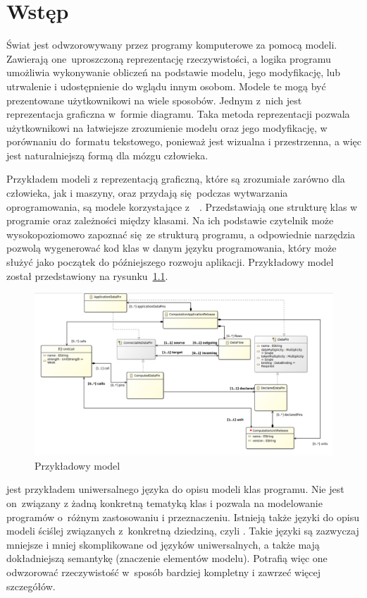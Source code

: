 \chapter{Wstęp}

Świat jest odwzorowywany przez programy komputerowe za pomocą modeli.
Zawierają one~uproszczoną reprezentację rzeczywistości, a logika programu
umożliwia wykonywanie obliczeń na podstawie modelu, jego modyfikację, lub
utrwalenie i udostępnienie do wglądu innym osobom.
Modele te mogą być prezentowane użytkownikowi na wiele sposobów. Jednym z~nich
jest reprezentacja graficzna w~formie diagramu. Taka metoda reprezentacji
pozwala użytkownikowi na łatwiejsze zrozumienie modelu
oraz jego modyfikację, w porównaniu do~formatu tekstowego, ponieważ jest
wizualna i przestrzenna, a więc jest naturalniejszą formą dla mózgu człowieka.

Przykładem modeli z reprezentacją graficzną, które są zrozumiałe zarówno dla
człowieka, jak i maszyny, oraz
przydają się podczas wytwarzania oprogramowania, są modele korzystające
z~~\cite{wikipedia-uml}. Przedstawiają
one strukturę klas w programie oraz zależności między klasami. Na ich podstawie
czytelnik może wysokopoziomowo zapoznać się~ze strukturą programu, a
odpowiednie narzędzia pozwolą wygenerować kod klas w danym języku
programowania, który może służyć jako początek do późniejszego rozwoju
aplikacji. Przykładowy model  został przedstawiony na
rysunku~\ref{rys:przykladowy-model-uml}.

\begin{figure}[!ht]
	\centering
	\includegraphics[width=0.95\linewidth]{./images/example-uml-model.png}
	\caption{Przykładowy model
		}\label{rys:przykladowy-model-uml}
\end{figure}

 jest przykładem uniwersalnego języka do opisu modeli klas
programu.
Nie jest on~związany z żadną konkretną tematyką klas i pozwala na modelowanie
programów o~różnym zastosowaniu i przeznaczeniu. Istnieją także języki do opisu
modeli ściślej związanych z~konkretną dziedziną, czyli . Takie
języki
są zazwyczaj mniejsze i mniej skomplikowane od języków uniwersalnych, a także
mają dokładniejszą semantykę (znaczenie elementów modelu). Potrafią więc one
odwzorować rzeczywistość w~sposób bardziej kompletny i zawrzeć więcej
szczegółów.

